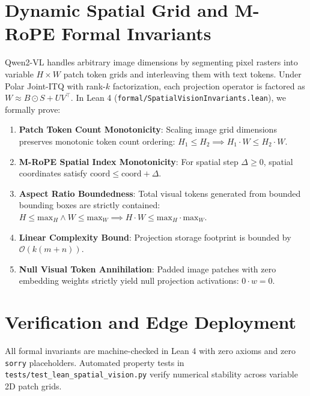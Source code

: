 \documentclass[10pt,twocolumn,letterpaper]{article}
\begin{document}
\section{Dynamic Spatial Grid and M-RoPE Formal Invariants}
Qwen2-VL handles arbitrary image dimensions by segmenting pixel rasters into variable $H \times W$ patch token grids and interleaving them with text tokens. Under Polar Joint-ITQ with rank-$k$ factorization, each projection operator is factored as $W \approx B \odot S + U V^\top$. In Lean 4 (\texttt{formal/SpatialVisionInvariants.lean}), we formally prove:
\begin{enumerate}
    \item \textbf{Patch Token Count Monotonicity}: Scaling image grid dimensions preserves monotonic token count ordering: $H_1 \le H_2 \implies H_1 \cdot W \le H_2 \cdot W$.
    \item \textbf{M-RoPE Spatial Index Monotonicity}: For spatial step $\Delta \ge 0$, spatial coordinates satisfy $\text{coord} \le \text{coord} + \Delta$.
    \item \textbf{Aspect Ratio Boundedness}: Total visual tokens generated from bounded bounding boxes are strictly contained: $H \le \text{max}_H \land W \le \text{max}_W \implies H \cdot W \le \text{max}_H \cdot \text{max}_W$.
    \item \textbf{Linear Complexity Bound}: Projection storage footprint is bounded by $\mathcal{O}(k(m + n))$.
    \item \textbf{Null Visual Token Annihilation}: Padded image patches with zero embedding weights strictly yield null projection activations: $0 \cdot w = 0$.
\end{enumerate}

\section{Verification and Edge Deployment}
All formal invariants are machine-checked in Lean 4 with zero axioms and zero \texttt{sorry} placeholders. Automated property tests in \texttt{tests/test_lean_spatial_vision.py} verify numerical stability across variable 2D patch grids.
\end{document}
